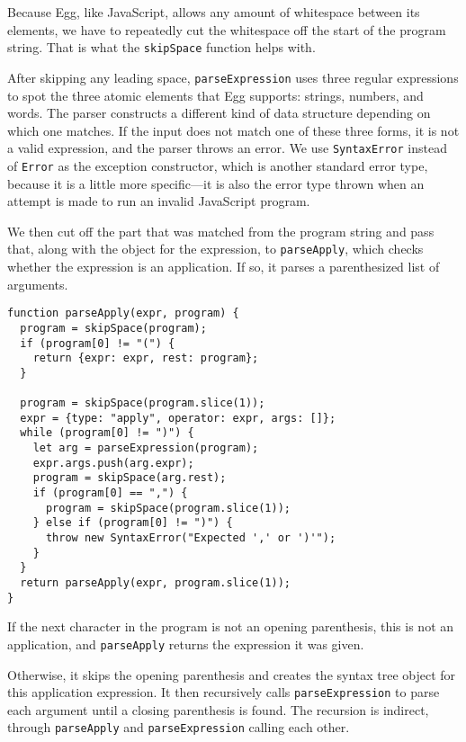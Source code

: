 Because Egg, like JavaScript, allows any amount of whitespace between its elements, we have to repeatedly cut the whitespace off the start of the program string. That is what the \lstinline`skipSpace` function helps with.

After skipping any leading space, \lstinline`parseExpression` uses three regular expressions to spot the three atomic elements that Egg supports: strings, numbers, and words. The parser constructs a different kind of data structure depending on which one matches. If the input does not match one of these three forms, it is not a valid expression, and the parser throws an error. We use \lstinline`SyntaxError` instead of \lstinline`Error` as the exception constructor, which is another standard error type, because it is a little more specific—it is also the error type thrown when an attempt is made to run an invalid JavaScript program.

We then cut off the part that was matched from the program string and pass that, along with the object for the expression, to \lstinline`parseApply`, which checks whether the expression is an application. If so, it parses a parenthesized list of arguments.

\begin{lstlisting}
function parseApply(expr, program) {
  program = skipSpace(program);
  if (program[0] != "(") {
    return {expr: expr, rest: program};
  }

  program = skipSpace(program.slice(1));
  expr = {type: "apply", operator: expr, args: []};
  while (program[0] != ")") {
    let arg = parseExpression(program);
    expr.args.push(arg.expr);
    program = skipSpace(arg.rest);
    if (program[0] == ",") {
      program = skipSpace(program.slice(1));
    } else if (program[0] != ")") {
      throw new SyntaxError("Expected ',' or ')'");
    }
  }
  return parseApply(expr, program.slice(1));
}
\end{lstlisting}
\noindent{}

If the next character in the program is not an opening parenthesis, this is not an application, and \lstinline`parseApply` returns the expression it was given.

Otherwise, it skips the opening parenthesis and creates the syntax
tree object for this application expression. It then recursively calls \lstinline`parseExpression` to parse each argument until a closing parenthesis is found. The recursion is indirect, through \lstinline`parseApply` and \lstinline`parseExpression` calling each other.

